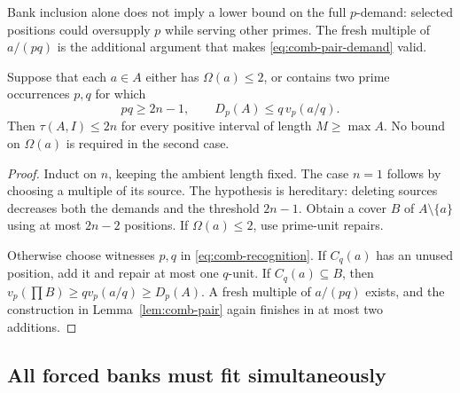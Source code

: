 Bank inclusion alone does not imply a lower bound on the full
$p$-demand: selected positions could oversupply $p$ while serving
other primes. The fresh multiple of $a/(pq)$ is the additional
argument that makes \eqref{eq:comb-pair-demand} valid.

\begin{theorem}
\label{thm:comb-recognition}
Suppose that each $a\in A$ either has $\Omega(a)\le2$, or contains
two prime occurrences $p,q$ for which
\begin{equation}
 pq\ge2n-1,
 \qquad D_p(A)\le q\,v_p(a/q).
 \label{eq:comb-recognition}
\end{equation}
Then $\tau(A,I)\le2n$ for every positive interval of length
$M\ge\max A$. No bound on $\Omega(a)$ is required in the second case.
\end{theorem}

\begin{proof}
Induct on $n$, keeping the ambient length fixed. The case $n=1$
follows by choosing a multiple of its source. The hypothesis is
hereditary: deleting sources decreases both the demands and the
threshold $2n-1$. Obtain a cover $B$ of $A\setminus\{a\}$ using
at most $2n-2$ positions. If $\Omega(a)\le2$, use prime-unit repairs.

Otherwise choose witnesses $p,q$ in \eqref{eq:comb-recognition}.
If $C_q(a)$ has an unused position, add it and repair at most one
$q$-unit. If $C_q(a)\subseteq B$, then
$v_p(\prod B)\ge qv_p(a/q)\ge D_p(A)$. A fresh multiple of
$a/(pq)$ exists, and the construction in Lemma~\ref{lem:comb-pair}
again finishes in at most two additions.
\end{proof}

\subsection{All forced banks must fit simultaneously}

